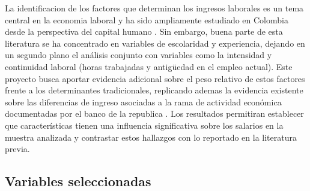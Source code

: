 \documentclass[
  spanish,
  letterpaper,
  DIV=11,
  numbers=noendperiod]{scrartcl}
\begin{document}
La identificacion de los factores que determinan los ingresos laborales es un
tema central en la economia laboral y ha sido ampliamente estudiado en Colombia
desde la perspectiva del capital humano \cite{mincer1974, nunez1998}. Sin embargo,
buena parte de esta literatura se ha concentrado en variables de escolaridad y
experiencia, dejando en un segundo plano el análisis conjunto con variables como
la intensidad y continuidad laboral (horas trabajadas y antigüedad en el empleo
actual). Este proyecto busca aportar evidencia adicional sobre el peso
relativo de estos factores frente a los determinantes tradicionales, replicando
ademas la evidencia existente sobre las diferencias de ingreso asociadas a la
rama de actividad económica documentadas por el banco de la republica \cite{banrep2021}.
Los resultados permitiran establecer que características tienen una influencia
significativa sobre los salarios en la muestra analizada y contrastar estos
hallazgos con lo reportado en la literatura previa.

\subsection{Variables seleccionadas}\label{variables-seleccionadas}

\begingroup\fontsize{8}{10}\selectfont
\end{document}
